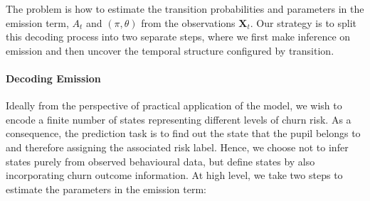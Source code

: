 The problem is how to estimate the transition probabilities and parameters in the emission term, $A_t$ and $(\pi, \theta)$ from the observations $\mathbf{X}_t$. Our strategy is to split this decoding process into two separate steps, where we first make inference on emission and then uncover the temporal structure configured by transition.

\paragraph*{Decoding Emission}

Ideally from the perspective of practical application of the model, we wish to encode a finite number of states representing different levels of churn risk. As a consequence, the prediction task is to find out the state that the pupil belongs to and therefore assigning the associated risk label. Hence, we choose not to infer states purely from observed behavioural data, but define states by also incorporating churn outcome information. At high level, we take two steps to estimate the parameters in the emission term:
